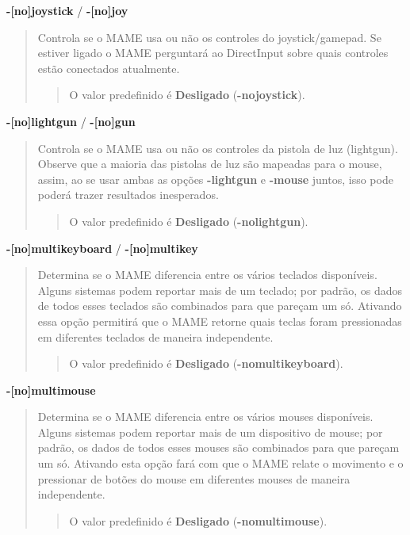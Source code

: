 \documentclass[letterpaper,10pt,brazil]{sphinxmanual}
\begin{document}
\textbf{-{[}no{]}joystick} / \textbf{-{[}no{]}joy}
\begin{quote}

Controla se o MAME usa ou não os controles do joystick/gamepad.
Se estiver ligado o MAME perguntará ao DirectInput sobre quais
controles estão conectados atualmente.
\begin{quote}

O valor predefinido é \textbf{Desligado} (\textbf{-nojoystick}).
\end{quote}
\end{quote}
\label{commandline/commandline-all:mame-commandline-nolightgun}
\textbf{-{[}no{]}lightgun} / \textbf{-{[}no{]}gun}
\begin{quote}

Controla se o MAME usa ou não os controles da pistola de luz
(lightgun). Observe que a maioria das pistolas de luz são mapeadas
para o mouse, assim, ao se usar ambas as opções \textbf{-lightgun} e
\textbf{-mouse} juntos, isso pode poderá trazer resultados inesperados.
\begin{quote}

O valor predefinido é \textbf{Desligado} (\textbf{-nolightgun}).
\end{quote}
\end{quote}
\label{commandline/commandline-all:mame-commandline-nomultikeyboard}
\textbf{-{[}no{]}multikeyboard} / \textbf{-{[}no{]}multikey}
\begin{quote}

Determina se o MAME diferencia entre os vários teclados disponíveis.
Alguns sistemas podem reportar mais de um teclado; por padrão, os
dados de todos esses teclados são combinados para que pareçam um só.
Ativando essa opção permitirá que o MAME retorne quais teclas foram
pressionadas em diferentes teclados de maneira independente.
\begin{quote}

O valor predefinido é \textbf{Desligado} (\textbf{-nomultikeyboard}).
\end{quote}
\end{quote}
\label{commandline/commandline-all:mame-commandline-nomultimouse}
\textbf{-{[}no{]}multimouse}
\begin{quote}

Determina se o MAME diferencia entre os vários mouses disponíveis.
Alguns sistemas podem reportar mais de um dispositivo de mouse;
por padrão, os dados de todos esses mouses são combinados para que
pareçam um só. Ativando esta opção fará com que o MAME relate o
movimento e o pressionar de botões do mouse em diferentes mouses de
maneira independente.
\begin{quote}

O valor predefinido é \textbf{Desligado} (\textbf{-nomultimouse}).
\end{quote}
\end{quote}
\end{document}
